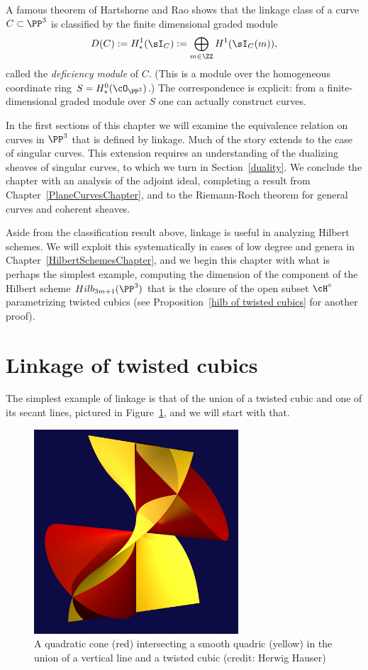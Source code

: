 A famous theorem of Hartshorne and Rao \cite{MR520926} shows that the linkage class of a curve $C\subset \PP^3$
is classified by the finite dimensional graded module 
$$
D(C) :=H^1_*(\sI_C):=\bigoplus_{m\in \ZZ} H^1(\sI_C(m)),
$$
called the \emph{deficiency module} of $C$. (This is a module over the homogeneous coordinate ring $S = H^0_*(\cO_{\PP^3})$.) The correspondence is explicit: from a finite-dimensional graded module over $S$ one can
actually construct curves.

In the first sections of this chapter we will examine the equivalence relation on curves in $\PP^3$ that is defined by linkage. Much of the story extends to the case of singular curves. This extension requires an understanding of the
dualizing sheaves of singular curves, to which we turn in Section~\ref{duality}. We conclude the chapter with an analysis of the adjoint ideal, completing a result from Chapter~\ref{PlaneCurvesChapter},  and to the Riemann-Roch theorem for general curves and coherent sheaves.

Aside from the classification result above, linkage is useful in analyzing Hilbert schemes. We will exploit this systematically in cases of low degree and genera in Chapter~\ref{HilbertSchemesChapter}, and we begin
this chapter with what is perhaps the simplest example, computing the dimension of the component of
the Hilbert scheme $Hilb_{3m+1}(\PP^3)$ that is the closure of the open subset $\cH^\circ$  parametrizing twisted cubics (see Proposition~\ref{hilb of twisted cubics} for another proof).

\section{Linkage of twisted cubics}
The simplest example of linkage is that of the union of a twisted cubic and one of its secant lines, pictured in
Figure~\ref{cubicAndLine}, and we will start with that.

\begin{figure}\label{cubicAndLine}
\centerline {\includegraphics[height=3in]{"main/Fig15-1-TwistAndShout"}}
 \caption{A quadratic cone (red) intersecting a smooth quadric (yellow) in the union of a vertical line and a twisted cubic (credit: Herwig Hauser)}
\end{figure}

